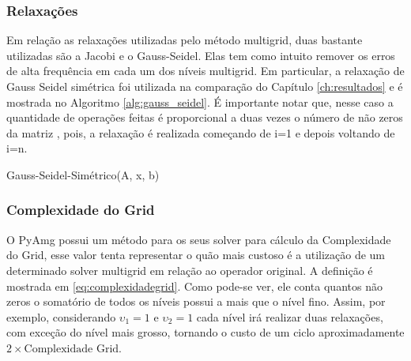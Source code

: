 \subsubsection{Relaxações}


Em relação as relaxações utilizadas pelo método multigrid, duas bastante utilizadas são a Jacobi e o Gauss-Seidel. Elas tem como intuito remover os erros de alta frequência em cada um dos níveis multigrid. Em particular, a relaxação de Gauss Seidel simétrica foi utilizada na comparação do Capítulo \ref{ch:resultados} e é mostrada no Algoritmo \ref{alg:gauss_seidel}. É importante notar que, nesse caso a quantidade de operações feitas é proporcional a duas vezes o número de não zeros da matriz , pois, a relaxação é realizada começando de i=1 e depois voltando de i=n.

\vspace{1cm}

\begin{algorithm}[H]
\caption{Gauss-Seidel-Simétrico(A, x, b)}
\label{alg:gauss_seidel}
\end{algorithm}

\vspace{1cm}


\subsubsection{Complexidade do Grid}
 
O PyAmg possui um método para os seus solver para cálculo da  Complexidade do Grid, esse valor tenta representar o quão mais custoso é a utilização de um determinado solver multigrid em relação ao operador original. A definição é mostrada em \eqref{eq:complexidadegrid}. Como pode-se ver, ele conta quantos não zeros o somatório de todos os níveis possui a mais que o nível fino. Assim, por exemplo, considerando $\upsilon_1=1$ e $\upsilon_2=1$ cada nível irá realizar duas relaxações, com exceção do nível mais grosso, tornando o  custo de um ciclo aproximadamente $2\times\text{Complexidade Grid}$. 

